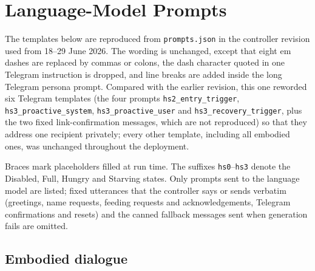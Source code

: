 \chapter{Language-Model Prompts}
\label{app:prompts}

The templates below are reproduced from \texttt{prompts.json} in the controller revision used from 18--29 June 2026. The wording is unchanged, except that eight em dashes are replaced by commas or colons, the dash character quoted in one Telegram instruction is dropped, and line breaks are added inside the long Telegram persona prompt. Compared with the earlier revision, this one reworded six Telegram templates (the four prompts \texttt{hs2\_\allowbreak{}entry\_\allowbreak{}trigger}, \texttt{hs3\_\allowbreak{}proactive\_\allowbreak{}system}, \texttt{hs3\_\allowbreak{}proactive\_\allowbreak{}user} and \texttt{hs3\_\allowbreak{}recovery\_\allowbreak{}trigger}, plus the two fixed link-confirmation messages, which are not reproduced) so that they address one recipient privately; every other template, including all embodied ones, was unchanged throughout the deployment.

Braces mark placeholders filled at run time. The suffixes \texttt{hs0}--\texttt{hs3} denote the Disabled, Full, Hungry and Starving states. Only prompts sent to the language model are listed; fixed utterances that the controller says or sends verbatim (greetings, name requests, feeding requests and acknowledgements, Telegram confirmations and resets) and the canned fallback messages sent when generation fails are omitted.

\section{Embodied dialogue}
